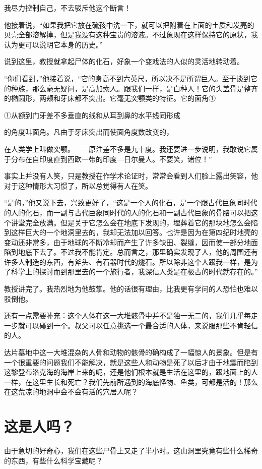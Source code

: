 \documentclass[10pt]{book}
\begin{document}
我尽力控制自己，不去驳斥他这个断言！

他接着说，“如果我把它放在硫孩中洗一下，就可以把附着在上面的土质和发亮的贝壳全部溶解掉，但是我没有这种宝贵的溶液。不过象现在这样保持它的原状，我认为更可以说明它本身的历史。”

说到这里，教授就拿起尸体的化石，好象一个变戏法的人似的灵活地转动着。

“你们看到，”他接着说，“它的身高不到六英尺，所以决不是所谓巨人。至于谈到它的种族，那么毫无疑问，是高加索人。跟我们一样，是白种人！它的头盖骨是整齐的椭圆形，两颊和牙床都不突出。它毫无突颚类的特征。它的面角①

①从额到门牙差不多垂直的线和从耳到鼻的水平线同形成

的角度叫面角。凡由于牙床突出而使面角度数改变的，

在人类学上叫做突颚。——原注差不多是九十度。我还要进一步说明，我敢说它属于分布在自印度直到西欧一带的印度—日尔曼人。不要笑，诸位！”

事实上并没有人笑，只是教授在作学术论证时，常常会看到人们脸上露出笑容，他对于这种情形大习惯了，所以总觉得有人在笑。

“是的，”他又说下去，兴致更好了，“这是一个人的化石，是一个跟古代巨象同时代的人的化石，而一副与古代巨象同时代的人的化石和一副古代巨象的骨胳可以把这个讲堂完全放满。但是关于它怎么会在地底下发现的，埋葬着它的那块地怎么会陷到这样巨大的一个地洞里去的，我却无法加以回答。也许是因为在第四纪时地壳的变动还非常多，由于地球的不断冷却而产生了许多缺田、裂缝，因而使一部分地面陷到地底下去了。不过我不能肯定。总而言之，那里确实发现了人，他的周围还有许多人制造的东西，有斧头、有石器时代的燧石。所以除非这个人跟我一样，是为了科学上的探讨而到那里去的一个旅行者，我深信人类是在极古的时代就存在的。”

教授讲完了。我热烈地为他鼓掌。他的话很有理由，比我更有学问的人恐怕也难以驳倒他。

还有一点需要补充：这个人体在这一大堆骸骨中并不是独一无二的，我们几乎每走一步就可以碰到一个。叔父可以任意挑选一个最合适的人体，来说服那些不肯轻信的人。

达片墓地中这一大堆混杂的人骨和动物的骸骨的确构成了一幅惊人的景象。但是有一个很重要的问题我们不能解决，就是这些人和动物是死了以后才由于地震而陷到这黎登布洛克海的海岸上来的呢，还是他们根本就是生活在这里的，跟地面上的人一样，在这里生长和死亡？我们先前所遇到的海底怪物、鱼类，可都是活的！那么在这荒凉的地洞中会不会有活的穴居人呢？
\chapter{这是人吗？}
由于急切的好奇心，我们在这些尸骨上又走了半小时。这山洞里究竟有些什么稀奇的东西，有些什么科学宝藏呢？
\end{document}
